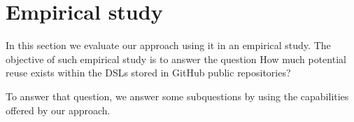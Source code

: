 \section{Empirical study}
\label{sec:validation}

In this section we evaluate our approach using it in an empirical study. The objective of such empirical study is to answer the question How much potential reuse exists within the DSLs stored in GitHub public repositories?

To answer that question, we answer some subquestions by using the capabilities offered by our approach. 
